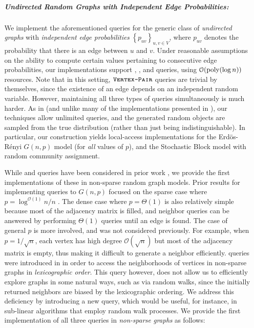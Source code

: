 \subparagraph*{Undirected Random Graphs with Independent Edge Probabilities:}
\label{par:undirected_random_graphs_with_independent_edge_probabilities}
We implement the aforementioned queries for the generic class of \emph{undirected graphs} with \emph{independent edge probabilities}
$\left\{ p_{uv} \right\}_{u,v\in V}$, where $p_{uv}$ denotes the probability that there is an edge between $u$ and $v$.
Under reasonable assumptions on the ability to compute certain values pertaining to consecutive edge probabilities,
our implementations support , , and  queries,
using $\mathcal{O}(\mathrm{poly}(\log n))$ resources.
Note that in this setting, $\texttt{\textsc{Vertex-Pair}}$ queries are trivial by themselves,
since the existence of an edge depends on an independent random variable.
However, maintaining all three types of queries simultaneously is much harder.
As in \cite{reut} (and unlike many of the implementations presented in \cite{huge_old,huge}), our techniques allow unlimited queries,
and the generated random objects are sampled from the true distribution (rather than just being indistinguishable).
In particular, our construction yields local-access implementations for the Erd\"{o}s-R\'{e}nyi $G(n,p)$ model (for \emph{all} values of $p$),
and the Stochastic Block model with random community assignment.


\vspace{-1.5em}

While  and  queries %
have been considered in prior work \cite{reut, huge_old, sparse},
we provide the first implementations of these in non-sparse random graph models.
Prior results for implementing queries to $G(n,p)$ focused on the sparse case where $p = \log^{\mathcal O(1)} n/n$ \cite{sparse}.
The dense case where $p = \Theta(1)$ is also relatively simple because most of the adjacency matrix is filled,
and neighbor queries can be answered by performing $\Theta(1)$  queries until an edge is found.
The case of general $p$ is more involved, and was not considered previously.
For example, when $p = 1/\sqrt{n}$, each vertex has high degree $\mathcal O(\sqrt{n})$ but most of the adjacency matrix is empty,
thus making it difficult to generate a neighbor efficiently.
 queries were introduced in \cite{reut}
in order to access the neighborhoods of vertices in non-sparse graphs in \emph{lexicographic order}.
This query however, does not allow us to efficiently explore graphs in some natural ways, such as via random walks,
since the initially returned neighbors are biased by the lexicographic ordering.
We address this deficiency by introducing a new  query,
which would be useful, for instance, in sub-linear algorithms that employ random walk processes.
We provide the first implementation of all three queries in \emph{non-sparse graphs} as follows:


